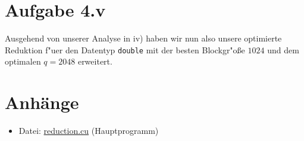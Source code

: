 \documentclass[%
	paper=A4,	%
	pagesize,	%
	DIV=calc,	%
	smallheadings,	%
	ngerman		%
]{scrartcl}
\begin{document}
\section*{Aufgabe 4.v}
Ausgehend von unserer Analyse in iv) haben wir nun also unsere optimierte Reduktion f"uer den Datentyp \texttt{double} mit der besten Blockgr"o\ss e $1024$ und dem optimalen $q=2048$ erweitert.



\section*{Anhänge}
\begin{itemize}
	\item Datei: \url{reduction.cu} (Hauptprogramm)
\end{itemize}
\end{document}

